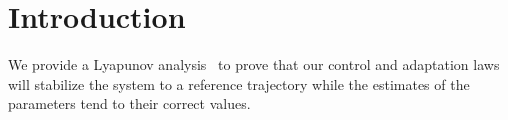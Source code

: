 \section{Introduction}
\label{sec:intro}

We provide a Lyapunov analysis~\cite{khalil2015nonlinear} to prove that our
control and adaptation laws will stabilize the system to a reference trajectory
while the estimates of the parameters tend to their correct values.
